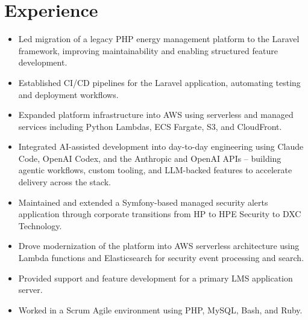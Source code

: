 \section{Experience}

\begin{itemize}
  \item Led migration of a legacy PHP energy management platform to the Laravel framework,
        improving maintainability and enabling structured feature development.
  \item Established CI/CD pipelines for the Laravel application, automating testing and
        deployment workflows.
  \item Expanded platform infrastructure into AWS using serverless and managed services
        including Python Lambdas, ECS Fargate, S3, and CloudFront.
  \item Integrated AI-assisted development into day-to-day engineering using Claude Code,
        OpenAI Codex, and the Anthropic and OpenAI APIs -- building agentic workflows,
        custom tooling, and LLM-backed features to accelerate delivery across the stack.
\end{itemize}
\vspace{0.6em}

\begin{itemize}
  \item Maintained and extended a Symfony-based managed security alerts application through
        corporate transitions from HP to HPE Security to DXC Technology.
  \item Drove modernization of the platform into AWS serverless architecture using Lambda
        functions and Elasticsearch for security event processing and search.
\end{itemize}
\vspace{0.6em}

\begin{itemize}
  \item Provided support and feature development for a primary LMS application server.
  \item Worked in a Scrum Agile environment using PHP, MySQL, Bash, and Ruby.
\end{itemize}

\vspace{1em}